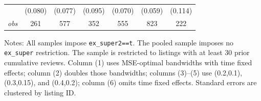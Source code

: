 \begin{table}[!htbp]
\begin{tabular}{lcccccc}
 & (0.080) & (0.077) & (0.095) & (0.070) & (0.059) & (0.114) \\
\textit{obs} & 261 & 577 & 352 & 555 & 823 & 222 \\
\bottomrule
\end{tabular}
\begin{minipage}{0.98\textwidth}\footnotesize
Notes: All samples impose \texttt{ex\_super2==t}. The pooled sample imposes no \texttt{ex\_super} restriction. The sample is restricted to listings with at least 30 prior cumulative reviews. Column (1) uses MSE-optimal bandwidths with time fixed effects; column (2) doubles those bandwidths; columns (3)--(5) use (0.2,0.1), (0.3,0.15), and (0.4,0.2); column (6) omits time fixed effects. Standard errors are clustered by listing ID.
\end{minipage}
\end{table}

